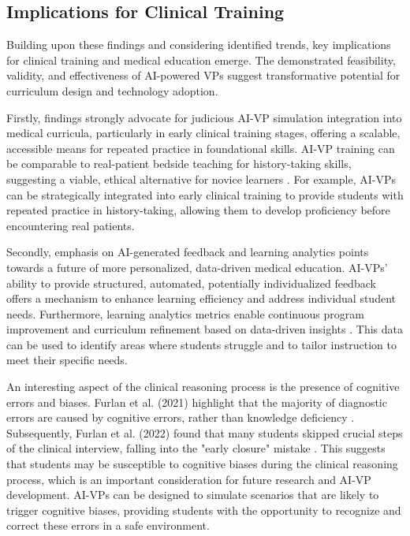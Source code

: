 \subsection*{\textbf{Implications for Clinical Training}}

Building upon these findings and considering identified trends, key implications for clinical training and medical education emerge. The demonstrated feasibility, validity, and effectiveness of AI-powered VPs suggest transformative potential for curriculum design and technology adoption.

Firstly, findings strongly advocate for judicious AI-VP simulation integration into medical curricula, particularly in early clinical training stages, offering a scalable, accessible means for repeated practice in foundational skills. AI-VP training can be comparable to real-patient bedside teaching for history-taking skills, suggesting a viable, ethical alternative for novice learners \cite{co_using_2022}. For example, AI-VPs can be strategically integrated into early clinical training to provide students with repeated practice in history-taking, allowing them to develop proficiency before encountering real patients.

Secondly, emphasis on AI-generated feedback and learning analytics points towards a future of more personalized, data-driven medical education. AI-VPs' ability to provide structured, automated, potentially individualized feedback offers a mechanism to enhance learning efficiency and address individual student needs. Furthermore, learning analytics metrics enable continuous program improvement and curriculum refinement based on data-driven insights \cite{furlan_learning_2022}. This data can be used to identify areas where students struggle and to tailor instruction to meet their specific needs.

An interesting aspect of the clinical reasoning process is the presence of cognitive errors and biases. Furlan et al. (2021) highlight that the majority of diagnostic errors are caused by cognitive errors, rather than knowledge deficiency \cite{furlan_natural_2021}. Subsequently, Furlan et al. (2022) found that many students skipped crucial steps of the clinical interview, falling into the "early closure" mistake \cite{furlan_learning_2022}. This suggests that students may be susceptible to cognitive biases during the clinical reasoning process, which is an important consideration for future research and AI-VP development. AI-VPs can be designed to simulate scenarios that are likely to trigger cognitive biases, providing students with the opportunity to recognize and correct these errors in a safe environment. 


